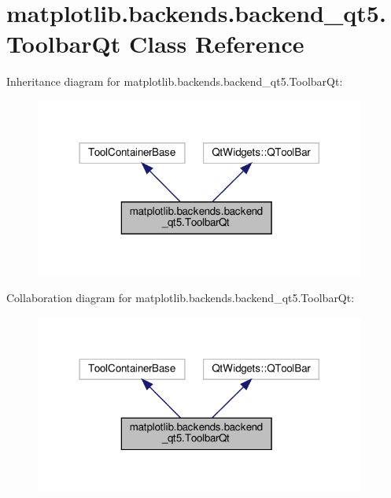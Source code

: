 \hypertarget{classmatplotlib_1_1backends_1_1backend__qt5_1_1ToolbarQt}{}\section{matplotlib.\+backends.\+backend\+\_\+qt5.\+Toolbar\+Qt Class Reference}
\label{classmatplotlib_1_1backends_1_1backend__qt5_1_1ToolbarQt}


Inheritance diagram for matplotlib.\+backends.\+backend\+\_\+qt5.\+Toolbar\+Qt\+:
\nopagebreak
\begin{figure}[H]
\begin{center}
\leavevmode
\includegraphics[width=308pt]{classmatplotlib_1_1backends_1_1backend__qt5_1_1ToolbarQt__inherit__graph}
\end{center}
\end{figure}


Collaboration diagram for matplotlib.\+backends.\+backend\+\_\+qt5.\+Toolbar\+Qt\+:
\nopagebreak
\begin{figure}[H]
\begin{center}
\leavevmode
\includegraphics[width=308pt]{classmatplotlib_1_1backends_1_1backend__qt5_1_1ToolbarQt__coll__graph}
\end{center}
\end{figure}
